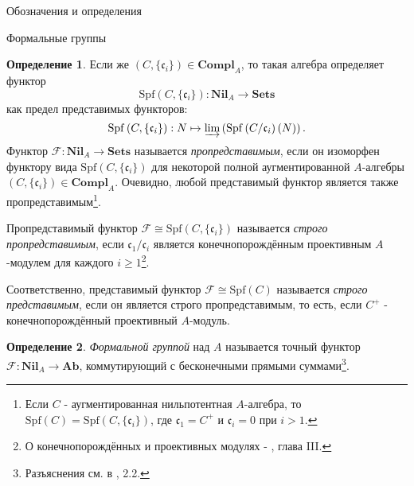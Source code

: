 \documentclass[a4paper,14pt]{extarticle}
\theoremstyle{definition}
\newtheorem{definition}{Определение}[section]
\newcommand{\Ab}{\mathbf{Ab}}
\newcommand{\Sets}{\mathbf{Sets}}
\newcommand{\Compl}[1]{\mathbf{Compl}_{#1}}
\newcommand{\Nil}[1]{\mathbf{Nil}_{#1}}
\newcommand{\Spf}[1]{\mathrm{Spf}\left(#1\right)}
\newcommand{\fc}{\mathfrak{c}}
\newcommand{\sF}{\mathscr{F}}
\begin{document}
\begin{section}{Обозначения и определения}
\begin{subsection}{Формальные группы}
\begin{definition}
    Если же ${ (C, \{ \fc_i \}) \in \Compl{A} }$, то такая алгебра определяет функтор
    \begin{equation*}
        \Spf{C, \{\fc_i\}} : \Nil{A} \rightarrow \Sets
    \end{equation*}
    как предел представимых функторов:
    \begin{equation*}
        \Spf{C, \{\fc_i\}} :
        N \mapsto
        \varinjlim \left(
            \Spf{C / \fc_i}(N)
        \right).
    \end{equation*}
    Функтор ${ \sF : \Nil{A} \rightarrow \Sets }$ называется \textit{пропредставимым}, если он изоморфен функтору вида ${ \Spf{C, \{\fc_i\}} }$ для некоторой полной аугментированной $A$-алгебры ${ (C, \{ \fc_i \}) \in \Compl{A} }$. Очевидно, любой представимый функтор является также пропредставимым\footnote{
        Если $C$ - аугментированная нильпотентная $A$-алгебра, то ${ \Spf{C} = \Spf{C, \{\fc_i\}} }$, где ${ \fc_1 = C^+ }$ и ${ \fc_i = 0 }$ при ${ i > 1 }$.
    }.

    Пропредставимый функтор ${ \sF \cong \Spf{C, \{\fc_i\}} }$ называется \textit{строго пропредставимым}, если ${ \fc_1 / \fc_i }$ является конечнопорождённым проективным $A$-модулем для каждого ${ i \geq 1 }$\footnote{
        О конечнопорождённых и проективных модулях - \cite{Lang}, глава III.
    }.

    Соответственно, представимый функтор ${ \sF \cong \Spf{C} }$ называется \textit{строго представимым}, если он является строго пропредставимым, то есть, если $C^+$ - конечнопорождённый проективный $A$-модуль.
\end{definition}

\begin{definition}\label{def:3.1:formal_group}
    \textit{Формальной группой} над $A$ называется точный функтор ${ \sF : \Nil{A} \rightarrow \Ab }$, коммутирующий с бесконечными прямыми суммами\footnote{
        Разъяснения см. в \cite{Zink}, 2.2.
    }.
\end{definition}


\end{subsection}
\end{section}
\end{document}
